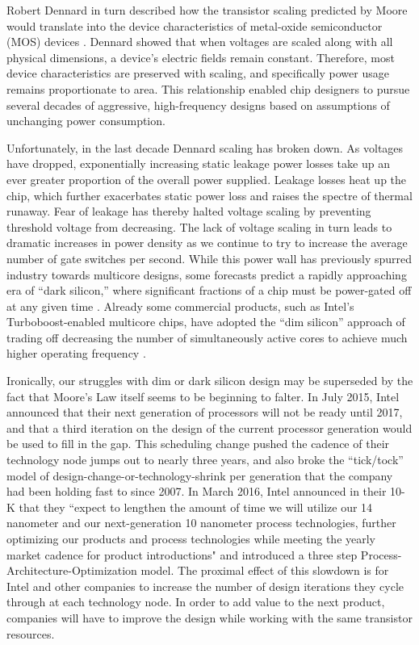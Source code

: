 Robert Dennard in turn described how the transistor scaling predicted by Moore would translate into the device characteristics of metal-oxide semiconductor (MOS) devices \cite{dennard1974design}.
Dennard showed that when voltages are scaled along with all physical dimensions, a device's electric fields remain constant.
Therefore, most device characteristics are preserved with scaling, and specifically power usage remains proportionate to area.
This relationship enabled chip designers to pursue several decades of aggressive, high-frequency designs based on assumptions of unchanging power consumption.

Unfortunately, in the last decade Dennard scaling has broken down.
As voltages have dropped, exponentially increasing static leakage power losses take up an ever greater proportion of the overall power supplied.
Leakage losses heat up the chip, which further exacerbates static power loss and raises the spectre of thermal runaway.
Fear of leakage has thereby halted voltage scaling by preventing threshold voltage from decreasing.
The lack of voltage scaling in turn leads to dramatic increases in power density as we continue to try to increase the average number of gate switches per second. 
While this power wall has previously spurred industry towards multicore designs,
some forecasts predict a rapidly approaching era of ``dark silicon,'' where significant fractions of a chip must be power-gated off at any given time \cite{esmaeilzadeh2011dark}.
Already some commercial products, such as Intel's Turboboost-enabled multicore chips, have adopted the ``dim silicon'' approach of trading off decreasing the number of simultaneously active cores to achieve much higher operating frequency \cite{wang2013implications}.

Ironically, our struggles with dim or dark silicon design may be superseded by the fact that Moore's Law itself seems to be beginning to falter.
In July 2015, Intel announced that their next generation of processors will not be ready until 2017,
and that a third iteration on the design of the current processor generation would be used to fill in the gap.
This scheduling change pushed the cadence of their technology node jumps out to nearly three years,
and also broke the ``tick/tock'' model of design-change-or-technology-shrink per generation that the company had been holding fast to since 2007.
In March 2016, Intel announced in their 10-K that they ``expect to lengthen the amount of time we will utilize our 14 nanometer and our next-generation 10 nanometer process technologies, further optimizing our products and process technologies while meeting the yearly market cadence for product introductions" and introduced a three step Process-Architecture-Optimization model.
The proximal effect of this slowdown is for Intel and other companies to increase the number of design iterations they cycle through at each technology node.
In order to add value to the next product, companies will have to improve the design while working with the same transistor resources.

